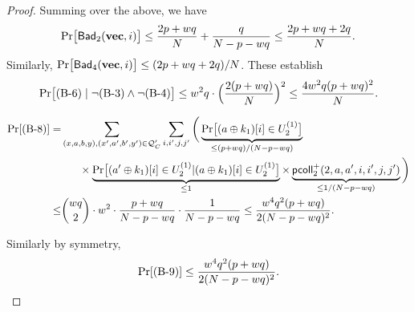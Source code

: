 \begin{proof}
Summing over the above, we have
%
\begin{align*}
{\Pr}\big[\mathsf{Bad}_2(\mathbf{vec},i)\big]  \leq  \frac{2p+wq}{N}+\frac{q}{N-p-wq}  \leq  \frac{2p+wq+2q}{N} .
\end{align*}
%
Similarly, ${\Pr}\big[\mathsf{Bad}_4(\mathbf{vec},i)\big]\leq(2p+wq+2q)/N$. These establish
%
$$
{\Pr}\big[\text{(B-6)}\mid\neg\text{(B-3)}\wedge\neg\text{(B-4)}\big] \leq
w^2q\cdot\Big(\frac{2(p+wq)}{N}\Big)^2\leq \frac{4w^2q(p+wq)^2}{N}.
$$


%
	\begin{align*}
	\Pr[\text{(B-8)}] 
	=   &  \sum_{(x,a,b,y),(x',a',b',y')\in\mathcal{Q}_{C}'}\sum_{i,i',j,j'}\bigg(\underbrace{{\Pr}\big[(a\oplus k_1)[i]\in U_2^{(1)}\big]}_{\leq(p+wq)/(N-p-wq)}     \\
	& \ \ \ \ \ \times
	\underbrace{{\Pr}\big[(a'\oplus k_1)[i]\in U_2^{(1)}|(a\oplus k_1)[i]\in U_2^{(1)}\big]}_{\leq1}\times\underbrace{\mathsf{pcoll}_{2}^+(2,a,a',i,i',j,j')}_{\leq1/(N-p-wq)}   \bigg)      \\
	\leq  &  {wq\choose 2}\cdot w^2\cdot\frac{p+wq}{N-p-wq}\cdot\frac{1}{N-p-wq}\leq
	\frac{w^4q^2(p+wq)}{2(N-p-wq)^2}.
	\end{align*}
	
	Similarly by symmetry,
	\begin{align*}
	\Pr[\text{(B-9)}] 
	\leq
	\frac{w^4q^2(p+wq)}{2(N-p-wq)^2}.
	\end{align*}
	

\end{proof}
